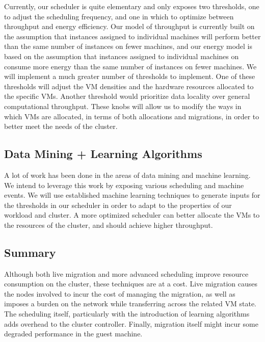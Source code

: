 Currently, our scheduler is quite elementary and only exposes two thresholds,
one to adjust the scheduling frequency, and one in which to optimize between
throughput and energy efficiency.  Our model of throughput is currently built on
the assumption that instances assigned to individual machines will perform
better than the same number of instances on fewer machines, and our energy model
is based on the assumption that instances assigned to individual machines on
consume more energy than the same number of instances on fewer machines.  We
will implement a much greater number of thresholds to implement.  One of these
thresholds will adjust the VM densities and the hardware resources allocated to
the specific VMs.  Another threshold would prioritize data locality over general
computational throughput.  These knobs will allow us to modify the ways in which
VMs are allocated, in terms of both allocations and migrations, in order to
better meet the needs of the cluster.

\subsection{Data Mining + Learning Algorithms}

A lot of work has been done in the areas of data mining and machine learning.
We intend to leverage this work by exposing various scheduling and machine
events.  We will use established machine learning techniques to generate inputs
for the thresholds in our scheduler in order to adapt to the properties of our
workload and cluster.  A more optimized scheduler can better allocate the
VMs to the resources of the cluster, and should achieve higher throughput.

\subsection{Summary}

Although both live migration and more advanced scheduling improve resource
consumption on the cluster, these techniques are at a cost.  Live migration
causes the nodes involved to incur the cost of managing the migration, as well
as imposes a burden on the network while transferring across the related VM
state.  The scheduling itself, particularly with the introduction of learning
algorithms adds overhead to the cluster controller.  Finally, migration itself
might incur some degraded performance in the guest machine.

